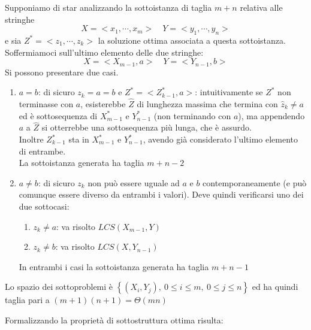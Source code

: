 Supponiamo di star analizzando la sottoistanza di taglia $m+n$ relativa alle stringhe
\[
    X = < x_1, \cdots, x_m > \quad  Y = < y_1, \cdots, y_n >
\]
 e sia
$ Z^* = < z_1, \cdots, z_k > $
la soluzione ottima associata a questa sottoistanza. 
Soffermiamoci sull'ultimo elemento delle due stringhe:
\[
     X = < X_{m-1}, a >  \quad  Y = < Y_{n-1}, b >
\]
Si possono presentare due casi.
\begin{enumerate}
    \item $a=b$: di sicuro $z_k=a=b$ e $ Z^* = < Z_{k-1}^*, a > $: intuitivamente se $Z^*$ non terminasse con $a$, esisterebbe $\widehat{Z}$ di lunghezza massima che termina con $\widehat{z}_k \neq a$ ed è sottosequenza di $X_{m-1}^*$ e $Y_{n-1}^*$ (non terminando con $a$), ma appendendo $a$ a $\widehat{Z}$ si otterrebbe una sottosequenza più lunga, che è assurdo.
        \\
        Inoltre $Z_{k-1}^*$ sta in $X_{m-1}^*$ e $Y_{n-1}^*$, avendo già considerato l'ultimo elemento di entrambe.
        \\
        La sottoistanza generata ha taglia $m+n-2$
    \item $a \neq b$: di sicuro $z_k$ non può essere uguale ad $a$ e $b$ contemporaneamente (e può comunque essere diverso da entrambi i valori). Deve quindi verificarsi uno dei due sottocasi:
        \begin{enumerate}[label=(\roman*)]
            \item $z_k \neq a$: va risolto $LCS\left( X_{m-1}, Y \right)$
            \item $z_k \neq b$: va risolto $LCS\left( X, Y_{n-1} \right)$
        \end{enumerate}
        In entrambi i casi la sottoistanza generata ha taglia $m+n-1$
\end{enumerate}

Lo spazio dei sottoproblemi è $\left\{ \left( X_i, Y_j \right), \: 0 \leq i \leq m, \: 0 \leq j \leq n \right\}$ ed ha quindi taglia pari a $(m+1)(n+1) = \Theta (mn)$

Formalizzando la proprietà di sottostruttura ottima risulta:

